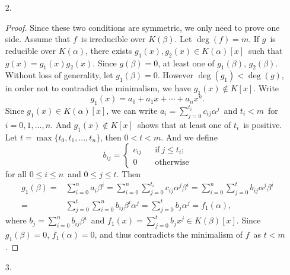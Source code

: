 \documentclass[12pt]{article}
\newcommand{\Q}{\mathbb{Q}}
\begin{document}
\begin{enumerate}
\begin{enumerate}
\begin{proof}
$$\begin{aligned}
				\leq&11\cdot[K:\Q(\sqrt{2},\sqrt{5},\sqrt[4]{7},\sqrt[5]{17})]\cdot[\Q(\sqrt{2},\sqrt{5},\sqrt[4]{7},\sqrt[5]{17}):\Q]\\
				\leq&11\cdot 2\cdot[\Q(\sqrt{2},\sqrt{5},\sqrt[4]{7})(\sqrt[5]{17}):\Q(\sqrt{2},\sqrt{5},\sqrt[4]{7})]\cdot[\Q(\sqrt{2},\sqrt{5},\sqrt[4]{7}):\Q]\\
				\leq&\cdots\\
				\leq&11\cdot2\cdot2\cdot4\cdot5\cdot2\\
				=&1760.
			\end{aligned}$$
		\end{proof}
	\end{enumerate}
	\item[2.]
	\begin{proof}
		\quad Since these two conditions are symmetric, we only need to prove one side. Assume that $f$\ is irreducible over $K(\beta)$. Let $\deg(f)=m$. If $g$\ is reducible over $K(\alpha)$, there exists $g_1(x),g_2(x)\in K(\alpha)[x]$\ such that $g(x)=g_1(x)g_2(x)$. Since $g(\beta)=0$, at least one of $g_1(\beta)$, $g_2(\beta)$. Without loss of generality, let $g_1(\beta)=0$. However $\deg(g_1)<\deg(g)$, in order not to contradict the minimalism, we have $g_1(x)\notin K[x]$. Write
		$$g_1(x)=a_0+a_1x+\cdots+a_nx^n.$$
		Since $g_1(x)\in K(\alpha)[x]$, we can write $a_i=\sum_{j=0}^{t_i}c_{ij}\alpha^j$\ and $t_i<m$\ for $i=0,1,...,n$. And $g_1(x)\notin K[x]$\ shows that at least one of $t_i$\ is positive. Let $t=\max\{t_0,t_1,...,t_n\}$, then $0<t<m$. And we define
		$$b_{ij}=\left\{
			\begin{array}{rcl}
				c_{ij}&&\text{if}\ j\leq t_i;\\
				0&&\text{otherwise}
			\end{array}
		\right.$$
		for all $0\leq i\leq n$\ and $0\leq j\leq t$. Then
		$$\begin{aligned}
		g_1(\beta)
		=&\sum_{i=0}^na_i\beta^i=\sum_{i=0}^n\sum_{j=0}^{t_i}c_{ij}\alpha^j\beta^i=\sum_{i=0}^n\sum_{j=0}^{t}b_{ij}\alpha^j\beta^i\\
		=&\sum_{j=0}^{t}\sum_{i=0}^nb_{ij}\beta^i\alpha^j=\sum_{j=0}^{t}b_j\alpha^j=f_1(\alpha),
		\end{aligned}$$
		where $b_j=\sum_{i=0}^nb_{ij}\beta^i$\ and $f_1(x)=\sum_{j=0}^tb_jx^j\in K(\beta)[x]$. Since $g_1(\beta)=0$, $f_1(\alpha)=0$, and thus contradicts the minimalism of $f$\ as $t<m$.
	\end{proof}
	\item[3.]
	\begin{enumerate}

\end{enumerate}
\end{enumerate}
\end{document}
